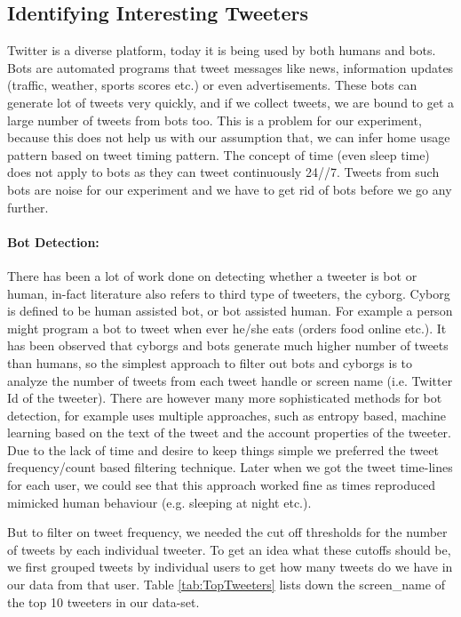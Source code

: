 \documentclass[12pt]{report}
\theoremstyle{named}
\begin{document}
\subsection{Identifying Interesting Tweeters}
Twitter is a diverse platform, today it is being used by both humans and bots. Bots are automated programs that tweet messages like news, information updates (traffic, weather, sports scores etc.) or even advertisements. These bots can generate lot of tweets very quickly, and if we collect tweets, we are bound to get a large number of tweets from bots too. This is a problem for our experiment, because this does not help us with our assumption that, we can infer home usage pattern based on tweet timing pattern. The concept of time (even sleep time) does not apply to bots as they can tweet continuously 24//7. Tweets from such bots are noise for our experiment and we have to get rid of bots before we go any further.
\paragraph{Bot Detection:\\}
There has been a lot of work done on detecting whether a tweeter is bot or human, in-fact literature also refers to third type of tweeters, the cyborg. Cyborg is defined to be human assisted bot, or bot assisted human. For example a person might program a bot to tweet when ever he/she eats (orders food online etc.). It has been observed that cyborgs and bots generate much higher number of tweets than humans, so the simplest approach to filter out bots and cyborgs is to analyze the number of tweets from each tweet handle or screen name (i.e. Twitter Id of the tweeter). 
There are however many more sophisticated methods for bot detection, for example \cite{chu2010tweeting} uses multiple approaches, such as entropy based, machine learning based on the text of the tweet and the account properties of the tweeter. Due to the lack of time and desire to keep things simple we preferred the tweet frequency/count based filtering technique. Later when we got the tweet time-lines for each user, we could see that this approach worked fine as times reproduced mimicked human behaviour (e.g. sleeping at night etc.). 

But to filter on tweet frequency, we needed the cut off thresholds for the number of tweets by each individual tweeter. To get an idea what these cutoffs should be, we first grouped tweets by individual users to get how many tweets do we have in our data from that user. Table \ref{tab:TopTweeters} lists down the screen\_name of the top 10 tweeters in our data-set.
\end{document}
